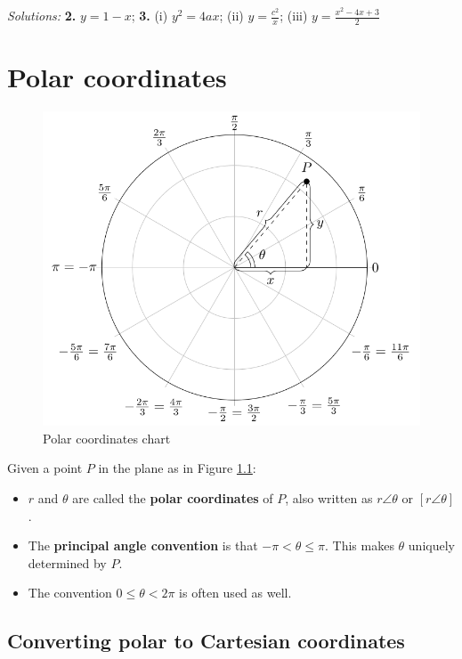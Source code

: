 \documentclass[
  12pt,
  oneside]{book}
\providecommand{\tightlist}{%
  \setlength{\itemsep}{0pt}\setlength{\parskip}{0pt}}
\theoremstyle{definition}
\theoremstyle{definition}
\theoremstyle{definition}
\theoremstyle{definition}
\theoremstyle{remark}
\begin{document}
\emph{Solutions:}
\textbf{2.} \(y=1-x\);
\textbf{3.} (i) \(y^2=4ax\);
(ii) \(y=\frac{c^2}{x}\);
(iii) \(y=\frac{x^2-4x+3}{2}\)

\chapter{Polar coordinates}\label{polar-coordinates}

\begin{figure}

{\centering \includegraphics{t18-polar-pics-1} 

}

\caption{Polar coordinates chart}\label{fig:t18-polar-chart}
\end{figure}

Given a point \(P\) in the plane as in Figure \ref{fig:t18-polar-chart}:

\begin{itemize}
\tightlist
\item
  \(r\) and \(\theta\) are called the \textbf{polar coordinates} of \(P\), also written as \(r\angle\theta\) or \([r\angle\theta]\).
\item
  The \textbf{principal angle convention} is that \(-\pi<\theta\leq\pi\). This makes \(\theta\) uniquely determined by \(P\).
\item
  The convention \(0\leq\theta<2\pi\) is often used as well.
\end{itemize}

\section{Converting polar to Cartesian coordinates}\label{converting-polar-to-cartesian-coordinates}
\end{document}
